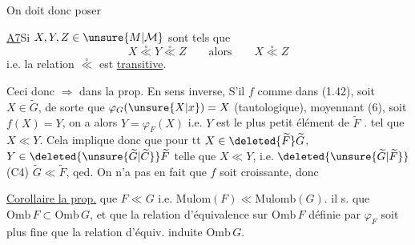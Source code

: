 On doit donc poser

\uline{A7}\quad Si $X,Y,Z\in\unsure{M|\mathcal{M}}$ sont tels que
\[
 X\overset{\circ}{\ll}Y\overset{\circ}{\ll}Z\qquad\text{alors}\qquad X\overset{\circ}{\ll}Z
\]
i.e. la relation $\overset{\circ}{\ll}$ est \uline{transitive}.

Ceci  donc $\Rightarrow$ dans la prop.
En sens inverse, S'il  $f$ comme dans (1.42), soit $X\in\widetilde G$,   de sorte que $\varphi_G(\unsure{X|x})=X$ (tautologique), moyennant (6),  soit $f(X)=Y$, on a alors $Y=\varphi_F(X)$ i.e. $Y$ est le plus petit élément de $\widetilde F$ .  tel que $X\ll Y$. Cela  implique donc que pour tt $X\in\deleted{\widetilde F}\widetilde G$,  $Y\in\deleted{\unsure{\widetilde G|\widetilde C}}\widetilde F$ telle que $X\ll Y$, i.e. $\deleted{\unsure{\widetilde G|\widetilde F}}$ (C4) $\widetilde G\ll\widetilde F$, qed. On n'a pas  en fait que $f$ soit croissante, donc

\uline{Corollaire  la prop.}\quad {}  que $F\ll G$ i.e. $\mathrm{Mulom}(F)\ll\mathrm{Mulomb}(G)$. il s. que $\mathrm{Omb}\,F\subset\mathrm{Omb}\,G$,
et que  la relation d'équivalence  sur $\mathrm{Omb}\,F$ définie par $\varphi_F$ soit plus fine que la relation d'équiv. induite  $\mathrm{Omb}\,G$.
